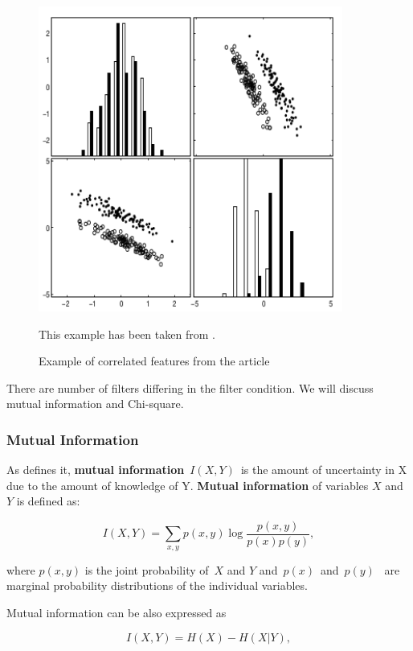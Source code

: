 \begin{figure}[ht]\centering
\includegraphics[width=100mm]{../img/guyeli_figure3.png}
\caption{Example of correlated features from the article}
This example has been taken from \citet{GuyEli03}.
\label{fig:guyeli03-figure3}
\end{figure}

There are number of filters differing in the filter condition.
We will discuss mutual information and Chi-square.

\subsubsection{Mutual Information}\label{subsubsec:mi}

As \citet{Hoq14} defines it,
{\bf mutual information}~$I(X, Y)$~is the amount of uncertainty in X due to the amount of knowledge of Y.
{\bf Mutual information} of variables $X$ and $Y$ is defined as:

\begin{equation}
I(X,Y) = \sum_{x,y} p\left(x,y\right)
\log
\frac{p\left(x,y\right)}{p\left(x\right)p\left(y\right)},
\label{eq:mi}
\end{equation}

\noindent
where $p\left(x, y\right)$ is the joint probability of~$X$ and $Y$ and~$p(x)$~and~$p(y)$~
are marginal probability distributions of the individual variables.

Mutual information can be also expressed as

\begin{equation}
	I(X, Y) = H(X) - H(X|Y),
\end{equation}


